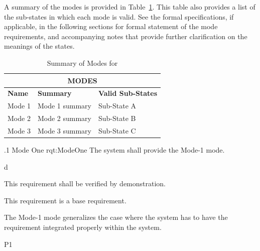 
A summary of the modes is provided in Table~\ref{tab:Modes}.
This table also provides a list of the sub-states in which each mode is valid.
See the formal specifications, if applicable, in the following sections for formal statement of the mode requirements, and accompanying notes that provide further clarification on the meanings of the states.
\begin{table}[htbp]
	\begin{center}
		\begin{tabular}{|p{1.0in}|p{4.0in}|p{1.0in}|}
			\hline
			\hline
			     \multicolumn{3}{|c|}{{\bf MODES}}\\
			\hline
{\bf Name} & {\bf Summary}	& {\bf Valid Sub-States}\\
			\hline
			\hline
Mode 1 & Mode 1 summary & Sub-State A\\ \hline
Mode 2 & Mode 2 summary & Sub-State B\\ \hline
Mode 3 & Mode 3 summary & Sub-State C\\ 
			\hline
			\hline
			\end{tabular}
				\caption{Summary of Modes for \ThisSystem}
				\label{tab:Modes}
		\end{center}
\end{table}


\ONERQMTV
{\RqtNumberBase.1}
{Mode One}
{rqt:ModeOne}
{The system shall provide the Mode-1 mode.}
{
	\item [Phase 1] d
}
{This requirement shall be verified by demonstration.}
{
	\item [N/A] This requirement is a base requirement.
}
{
	\item The Mode-1 mode generalizes the case where the system has to have the requirement integrated properly within the system.
}
{P1}


